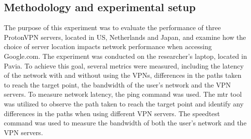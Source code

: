\documentclass[eng]{class}
\begin{document}
\subsection{Methodology and experimental setup}
The purpose of this experiment was to evaluate the performance of three ProtonVPN servers, located in US, Netherlands and Japan,
and examine how the choice of server location impacts network performance when accessing Google.com. The experiment was conducted on the researcher's laptop, located in Pavia.
To achieve this goal, several metrics were measured, including the latency of the network with and without using the VPNs,
differences in the paths taken to reach the target point, the bandwidth of the user's network and the VPN servers.\newline
To measure network latency, the ping command was used.
The mtr tool was utilized to observe the path taken to reach the target point and identify any differences in the paths when using different VPN servers.
The speedtest command was used to measure the bandwidth of both the user's network and the VPN servers.
\end{document}
